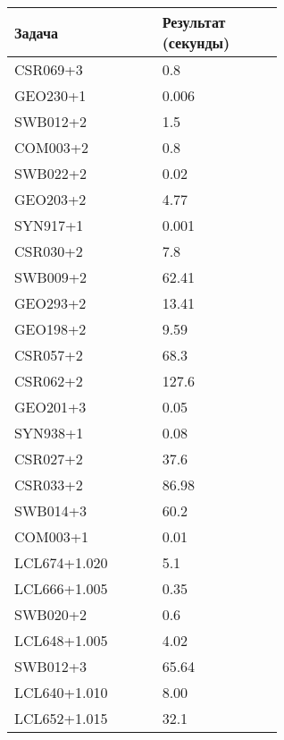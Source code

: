 \begin{longtable}[H]{|p{0.3\linewidth}|p{0.3\linewidth}|}
\hline
\textbf{Задача} & \textbf{Результат (секунды)} \\
\hline
CSR069+3 & 0.8  \\
\hline
GEO230+1 & 0.006  \\
\hline
SWB012+2 & 1.5  \\
\hline
COM003+2 & 0.8 \\
\hline
SWB022+2 & 0.02 \\
\hline
GEO203+2 & 4.77 \\
\hline
SYN917+1 & 0.001 \\
\hline
CSR030+2 & 7.8 \\
\hline
SWB009+2 & 62.41 \\
\hline
GEO293+2 & 13.41 \\
\hline
GEO198+2 & 9.59 \\
\hline
CSR057+2 & 68.3 \\
\hline
CSR062+2 & 127.6 \\
\hline
GEO201+3 & 0.05 \\
\hline
SYN938+1 & 0.08 \\
\hline
CSR027+2 & 37.6 \\
\hline
CSR033+2 & 86.98 \\
\hline
SWB014+3 & 60.2 \\
\hline
COM003+1 & 0.01 \\
\hline
LCL674+1.020 & 5.1 \\
\hline
LCL666+1.005 & 0.35 \\
\hline
SWB020+2 & 0.6 \\
\hline
LCL648+1.005 & 4.02 \\
\hline
SWB012+3 & 65.64 \\
\hline
LCL640+1.010 & 8.00 \\
\hline
LCL652+1.015 & 32.1 \\
\hline
\end{longtable}



